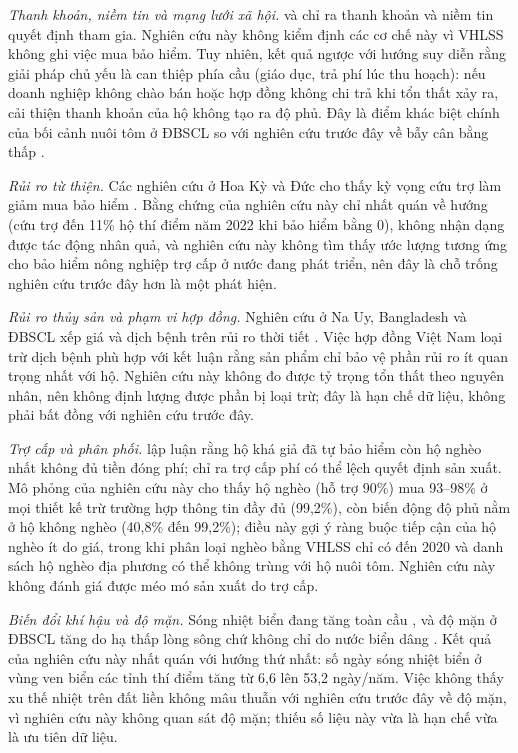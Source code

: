 \documentclass[12pt,a4paper]{article}
\begin{document}
\textit{Thanh khoản, niềm tin và mạng lưới xã hội.} \textcite{casaburi2018} và \textcite{cai2015} chỉ ra thanh khoản và niềm tin quyết định tham gia. Nghiên cứu này không kiểm định các cơ chế này vì VHLSS không ghi việc mua bảo hiểm. Tuy nhiên, kết quả ngược với hướng suy diễn rằng giải pháp chủ yếu là can thiệp phía cầu (giáo dục, trả phí lúc thu hoạch): nếu doanh nghiệp không chào bán hoặc hợp đồng không chi trả khi tổn thất xảy ra, cải thiện thanh khoản của hộ không tạo ra độ phủ. Đây là điểm khác biệt chính của bối cảnh nuôi tôm ở ĐBSCL so với nghiên cứu trước đây về bẫy cân bằng thấp \parencite{colexiong2017,carter2017}.

\textit{Rủi ro từ thiện.} Các nghiên cứu ở Hoa Kỳ và Đức cho thấy kỳ vọng cứu trợ làm giảm mua bảo hiểm \parencite{coate1995,kousky2018,andor2020}. Bằng chứng của nghiên cứu này chỉ nhất quán về hướng (cứu trợ đến 11\% hộ thí điểm năm 2022 khi bảo hiểm bằng 0), không nhận dạng được tác động nhân quả, và nghiên cứu này không tìm thấy ước lượng tương ứng cho bảo hiểm nông nghiệp trợ cấp ở nước đang phát triển, nên đây là chỗ trống nghiên cứu trước đây hơn là một phát hiện.

\textit{Rủi ro thủy sản và phạm vi hợp đồng.} Nghiên cứu ở Na Uy, Bangladesh và ĐBSCL xếp giá và dịch bệnh trên rủi ro thời tiết \parencite{bergfjord2009,ahsan2011,lecheong2010}. Việc hợp đồng Việt Nam loại trừ dịch bệnh phù hợp với kết luận rằng sản phẩm chỉ bảo vệ phần rủi ro ít quan trọng nhất với hộ. Nghiên cứu này không đo được tỷ trọng tổn thất theo nguyên nhân, nên không định lượng được phần bị loại trừ; đây là hạn chế dữ liệu, không phải bất đồng với nghiên cứu trước đây.

\textit{Trợ cấp và phân phối.} \textcite{binswanger2012} lập luận rằng hộ khá giả đã tự bảo hiểm còn hộ nghèo nhất không đủ tiền đóng phí; \textcite{goodwin2013} chỉ ra trợ cấp phí có thể lệch quyết định sản xuất. Mô phỏng của nghiên cứu này cho thấy hộ nghèo (hỗ trợ 90\%) mua 93--98\% ở mọi thiết kế trừ trường hợp thông tin đầy đủ (99,2\%), còn biến động độ phủ nằm ở hộ không nghèo (40,8\% đến 99,2\%); điều này gợi ý ràng buộc tiếp cận của hộ nghèo ít do giá, trong khi phân loại nghèo bằng VHLSS chỉ có đến 2020 và danh sách hộ nghèo địa phương có thể không trùng với hộ nuôi tôm. Nghiên cứu này không đánh giá được méo mó sản xuất do trợ cấp.

\textit{Biến đổi khí hậu và độ mặn.} Sóng nhiệt biển đang tăng toàn cầu \parencite{oliver2018,frolicher2018}, và độ mặn ở ĐBSCL tăng do hạ thấp lòng sông chứ không chỉ do nước biển dâng \parencite{eslami2019}. Kết quả của nghiên cứu này nhất quán với hướng thứ nhất: số ngày sóng nhiệt biển ở vùng ven biển các tỉnh thí điểm tăng từ 6,6 lên 53,2 ngày/năm. Việc không thấy xu thế nhiệt trên đất liền không mâu thuẫn với nghiên cứu trước đây về độ mặn, vì nghiên cứu này không quan sát độ mặn; thiếu số liệu này vừa là hạn chế vừa là ưu tiên dữ liệu.
\end{document}
